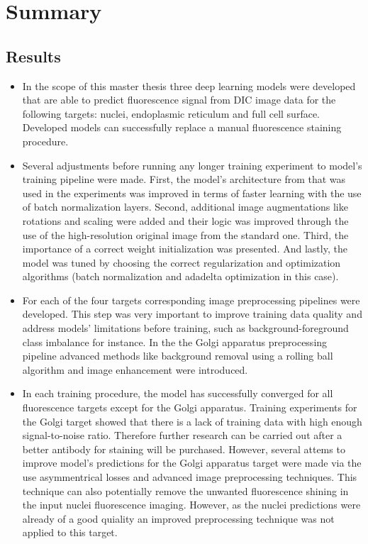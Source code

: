 \section{Summary}
\subsection{Results}
\begin{itemize}
    \item In the scope of this master thesis three deep learning models were developed that are able to predict fluorescence signal from DIC image data for the following targets: nuclei, endoplasmic reticulum and full cell surface. Developed models can successfully replace a manual fluorescence staining procedure. 
    
    \item Several adjustments before running any longer training experiment to model's training pipeline were made. First, the model's architecture from \cite{Lachance_2020} that was used in the experiments was improved in terms of faster learning with the use of batch normalization layers. Second, additional image augmentations like rotations and scaling were added and their logic was improved through the use of the high-resolution original image from the standard one. Third, the importance of a correct weight initialization was presented. And lastly, the model was tuned by choosing the correct regularization and optimization algorithms (batch normalization and adadelta optimization in this case). 
    
    \item For each of the four targets corresponding image preprocessing pipelines were developed. This step was very important to improve training data quality and address models' limitations before training, such as background-foreground class imbalance for instance. In the the Golgi apparatus preprocessing pipeline advanced methods like background removal using a rolling ball algorithm and image enhancement were introduced.
    
    \item In each training procedure, the model has successfully converged for all fluorescence targets except for the Golgi apparatus. Training experiments for the Golgi target showed that there is a lack of training data with high enough signal-to-noise ratio. Therefore further research can be carried out after a better antibody for staining will be purchased. However, several attems to improve model's predictions for the Golgi apparatus target were made via the use asymmentrical losses and advanced image preprocessing techniques. This technique can also potentially remove the unwanted fluorescence shining in the input nuclei fluorescence imaging. However, as the nuclei predictions were already of a good quiality an improved preprocessing technique was not applied to this target. 
    

\end{itemize}
